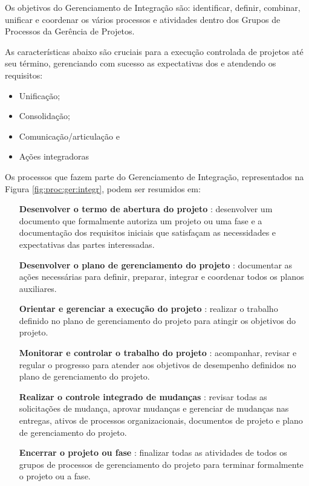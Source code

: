 


Os objetivos do Gerenciamento de Integração são: identificar, definir, combinar, unificar e coordenar os vários processos e atividades dentro dos Grupos de Processos da Gerência de Projetos.

As características abaixo são cruciais para a execução controlada de projetos até seu término, gerenciando com sucesso as expectativas dos \stake e atendendo os requisitos:

\begin{itemize}
	\item Unificação;
	\item Consolidação;
	\item Comunicação/articulação e 
	\item Ações integradoras
\end{itemize}

Os processos que fazem parte do Gerenciamento de Integração, representados na Figura \ref{fig:proc:ger:integr}, podem ser resumidos em:

\begin{itemize}

	\item[\textbf{Desenvolver o termo de abertura do projeto}]: desenvolver um documento que formalmente autoriza um projeto ou uma fase e a documentação dos requisitos iniciais que satisfaçam as necessidades e expectativas das partes interessadas.
	
	\item[\textbf{Desenvolver o plano de gerenciamento do projeto}]: documentar as ações necessárias para definir, preparar, integrar e coordenar todos os planos auxiliares. 
	
	\item[\textbf{Orientar e gerenciar a execução do projeto}]: realizar o trabalho definido no plano de gerenciamento do projeto para atingir os objetivos do	projeto. 
	
	\item[\textbf{Monitorar e controlar o trabalho do projeto}]: acompanhar, revisar e regular o progresso para atender aos objetivos de desempenho definidos no plano de gerenciamento do projeto.
	
	\item[\textbf{Realizar o controle integrado de mudanças}]: revisar todas as solicitações de mudança, aprovar mudanças e gerenciar de mudanças nas entregas, ativos de processos organizacionais, documentos de projeto e plano de gerenciamento do projeto.
	
	\item[\textbf{Encerrar o projeto ou fase}]: finalizar todas as atividades de todos os grupos de processos de gerenciamento do projeto para terminar formalmente o projeto ou a fase.
	
\end{itemize}

